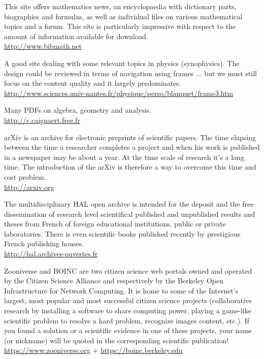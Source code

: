 	{\Large {}}{\Large {}}{\Large {}}\bcdfrance{} This site offers mathematics news, an encyclopaedia with dictionary parts, biographies and formulas, as well as individual files on various mathematical topics and a forum. This site is particularly impressive with respect to the amount of information available for download. \\
	\href{http://www.bibmath.net}{\color{blue} http://www.bibmath.net} 
	
	{\Large {}}{\Large {}}\bcdfrance{} A good site dealing with some relevant topics in physics (synophysics). The design could be reviewed in terms of navigation using frames ... but we must still focus on the content quality and it largely predominates.\\
	\href{http://www.sciences.univ-nantes.fr/physique/perso/blanquet/frame3.htm}{\color{blue} http://www.sciences.univ-nantes.fr/physique/perso/blanquet/frame3.htm}
	
	{\Large {}}{\Large {}}{\Large {}}\bcdfrance{} Many PDFs on algebra, geometry and analysis.\\
	\href{http://c.caignaert.free.fr}{\color{blue} http://c.caignaert.free.fr}
	
	{\Large {}}{\Large {}}{\Large {}} arXiv is an archive for electronic preprints of scientific papers. The time elapsing between the time a researcher completes a project and when his work is published in a newspaper may be about a year. At the time scale of research it's a long time. The introduction of the arXiv is therefore a way to overcome this time and cost problem.\\
	\href{http://arxiv.org}{\color{blue} http://arxiv.org}
	
	{\Large {}}{\Large {}}{\Large {}}\bcdfrance{} The multidisciplinary HAL open archive is intended for the deposit and the free dissemination of research level scientifical published and unpublished results and theses from French of foreign educational institutions, public or private laboratories. There is even scientific books published recently by prestigious French publishing houses.\\
	\href{http://hal.archives-ouvertes.fr}{\color{blue} http://hal.archives-ouvertes.fr}
	
	{\Large {}}{\Large {}}{\Large {}}{\Large {}}{\Large {}}{\Large {}} Zooniverse and BOINC are two citizen science web portals owned and operated by the Citizen Science Alliance and respectively by the Berkeley Open Infrastructure for Network Computing. It is home to some of the Internet's largest, most popular and most successful citizen science projects (collaborative research by installing a software to share computing power, playing a game-like scientific problem to resolve a hard problem, recognize images content, etc.). If you found a solution or a scientific evidence in one of these projects, your name (or nickname) will be quoted in the corresponding scientific publication!\\
	\href{https://www.zooniverse.org}{\color{blue} https://www.zooniverse.org} + \href{https://boinc.berkeley.edu}{\color{blue} https://boinc.berkeley.edu}
	
